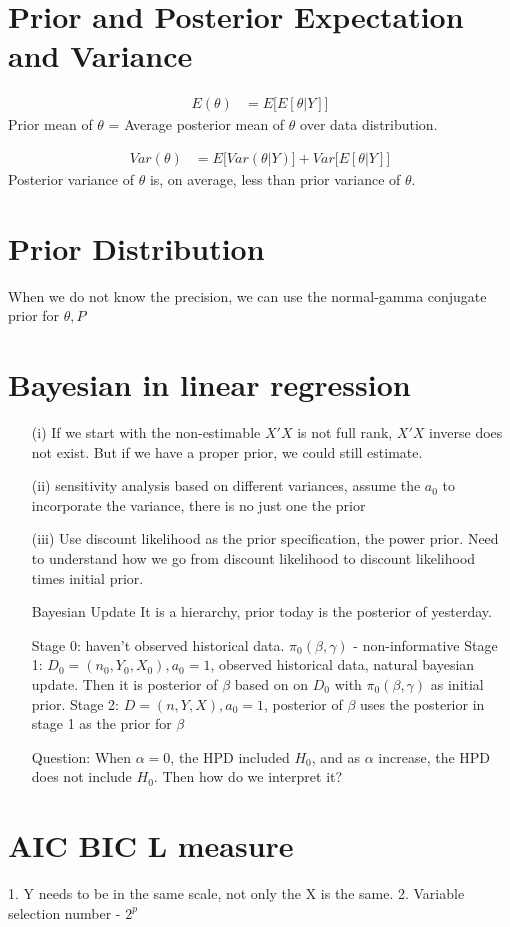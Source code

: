 
\section{Prior and Posterior Expectation and Variance}
 
\begin{align*}
	E(\theta) &= E \Big[ E[\theta | Y] \Big]
\end{align*}
Prior mean of $\theta$ = Average posterior mean of  $\theta$ over data distribution.

\begin{align*}
	Var(\theta) &= E \Big[ Var(\theta | Y) \Big] + Var \Big[ E[\theta | Y] \Big]
\end{align*}
Posterior variance of $\theta$ is, on average, less than prior variance of $\theta$.


\section{Prior Distribution}
When we do not know the precision, we can use the normal-gamma conjugate prior for $\theta, P$


\section{Bayesian in linear regression}

\begin{itemize}
\item[(i)] If we start with the non-estimable $X'X$ is not full rank, $X'X$ inverse does not exist. But if we have a proper prior, we could still estimate.

\item[(ii)] sensitivity analysis based on different variances, assume the $a_0$ to incorporate the variance, there is no just one the prior

\item[(iii)] Use discount likelihood as the prior specification, the power prior. Need to understand how we go from discount likelihood to discount likelihood times initial prior.

Bayesian Update
It is a hierarchy, prior today is the posterior of yesterday.

Stage 0: haven't observed historical data. $\pi_0(\beta, \gamma)$ - non-informative
Stage 1: $D_0 = (n_0, Y_0, X_0), a_0= 1$,  observed historical data, natural bayesian update. Then it is posterior of $\beta$ based on on $D_0$ with $\pi_0(\beta, \gamma)$ as initial prior.
Stage 2: $D= (n, Y, X), a_0 =1$, posterior of $\beta$ uses the posterior in stage 1 as the prior for $\beta$

Question:
When $\alpha=0$, the HPD included $H_0$, and as $\alpha$ increase, the HPD does not include $H_0$. Then how do we interpret it?


\end{itemize}

\section{AIC BIC L measure}
1. Y needs to be in the same scale, not only the X is the same.
2. Variable selection number - $2^p$


